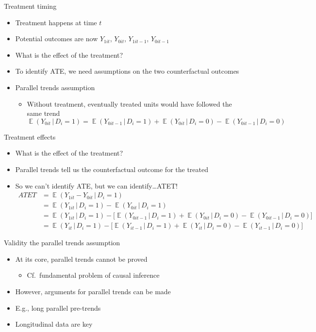 \documentclass[aspectratio=169,compress,handout,t,xcolor=table]{beamer}
\DeclareMathOperator{\E}{\mathbb{E}}                       %
\begin{document}
\begin{frame}{Treatment timing}
  \begin{itemize}
    \item Treatment happens at time \(t\)
    \item Potential outcomes are now \(Y_{1it}\), \(Y_{0it}\), \(Y_{1it-1}\), \(Y_{0it-1}\)
    \item What is the effect of the treatment?
    \item To identify ATE, we need assumptions on the two counterfactual outcomes
    \item Parallel trends assumption
    \begin{itemize}
      \item Without treatment, eventually treated units would have followed the same trend
      \begin{equation*}
        \E(Y_{0it} \,|\, D_i=1) = \E(Y_{0it-1} \,|\, D_i=1) + \E(Y_{0it} \,|\, D_i=0) - \E(Y_{0it-1} \,|\, D_i=0)
      \end{equation*}
    \end{itemize}
  \end{itemize}
\end{frame}

\begin{frame}{Treatment effects}
  \begin{itemize}
    \item What is the effect of the treatment?
    \item Parallel trends tell us the counterfactual outcome for the treated
    \item So we can't identify ATE, but we can identify\ldots ATET!
    \begin{align*}
      ATET &= \E(Y_{1it} - Y_{0it} \,|\, D_i=1) \\
           &= \E(Y_{1it} \,|\, D_i=1) - \E(Y_{0it} \,|\, D_i=1) \\
           &= \E(Y_{1it} \,|\, D_i=1) - \big[ \E(Y_{0it-1} \,|\, D_i=1) + \E(Y_{0it} \,|\, D_i=0) - \E(Y_{0it-1} \,|\, D_i=0) \big] \\
           &= \E(Y_{it} \,|\, D_i=1)  - \big[ \E(Y_{it-1} \,|\, D_i=1)  + \E(Y_{it} \,|\, D_i=0)  - \E(Y_{it-1} \,|\, D_i=0) \big]
    \end{align*}
  \end{itemize}
\end{frame}

\begin{frame}{Validity the parallel trends assumption}
  \begin{itemize}
    \item At its core, parallel trends cannot be proved
    \begin{itemize}
      \item Cf.\ fundamental problem of causal inference
    \end{itemize}
    \item However, arguments for parallel trends can be made
    \item E.g., long parallel pre-trends
    \item Longitudinal data are key
  \end{itemize}
\end{frame}
\end{document}
